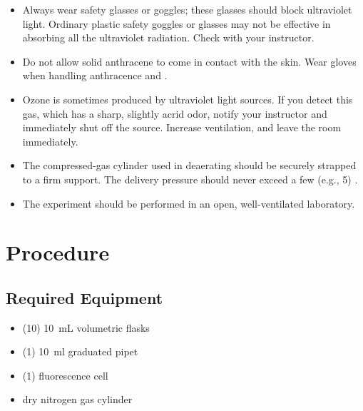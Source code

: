 \begin{itemize}
	\item Always wear safety glasses or goggles; these glasses should block ultraviolet light. 
	Ordinary plastic safety goggles or glasses may not be effective in absorbing all the ultraviolet radiation. 
	Check with your instructor.
	\item Do not allow solid anthracene to come in contact with the skin. 
	Wear gloves when handling anthracence and .
	\item Ozone is sometimes produced by ultraviolet light sources. 
	If you detect this gas, which has a sharp, slightly acrid odor, notify your instructor and immediately shut off the source.
	Increase ventilation, and leave the room immediately.
	\item The compressed-gas cylinder used in deaerating should be securely strapped to a firm support.
	The delivery pressure should never exceed a few (e.g., 5) \si{\psig}.
	\item The experiment should be performed in an open, well-ventilated laboratory.
\end{itemize}


\section{Procedure} %
\label{sec:procedure}

\subsection{Required Equipment} %
\label{sub:required_equipment}

\begin{itemize}
	\item (10) \SI{10}{\mL} volumetric flasks
	\item (1) \SI{10}{\ml} graduated pipet
	\item (1) fluorescence cell
	\item dry nitrogen gas cylinder
\end{itemize}



